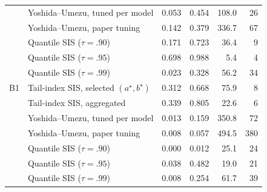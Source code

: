 \begin{table}[t]
\begin{tabular}{llrrrr}
 & Yoshida--Umezu, tuned per model & 0.053 & 0.454 & 108.0 & 26\\
 & Yoshida--Umezu, paper tuning & 0.142 & 0.379 & 336.7 & 67\\
 & Quantile SIS ($\tau=.90$) & 0.171 & 0.723 & 36.4 & 9\\
 & Quantile SIS ($\tau=.95$) & 0.698 & 0.988 & 5.4 & 4\\
 & Quantile SIS ($\tau=.99$) & 0.023 & 0.328 & 56.2 & 34\\
\addlinespace
B1 & Tail-index SIS, selected $(a^\star,b^\star)$ & 0.312 & 0.668 & 75.9 & 8\\
 & Tail-index SIS, aggregated & 0.339 & 0.805 & 22.6 & 6\\
 & Yoshida--Umezu, tuned per model & 0.013 & 0.159 & 350.8 & 72\\
 & Yoshida--Umezu, paper tuning & 0.008 & 0.057 & 494.5 & 380\\
 & Quantile SIS ($\tau=.90$) & 0.000 & 0.012 & 25.1 & 24\\
 & Quantile SIS ($\tau=.95$) & 0.038 & 0.482 & 19.0 & 21\\
 & Quantile SIS ($\tau=.99$) & 0.008 & 0.254 & 61.7 & 39\\
\bottomrule
\end{tabular}
\end{table}
